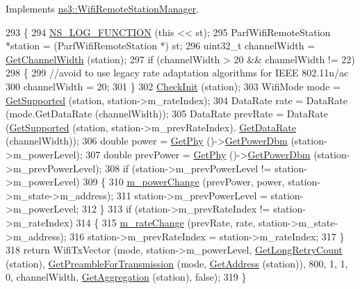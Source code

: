 Implements \hyperlink{classns3_1_1WifiRemoteStationManager_a5a6b2bfcd4959da43c54f0072bd01202}{ns3\+::\+Wifi\+Remote\+Station\+Manager}.


\begin{DoxyCode}
293 \{
294   \hyperlink{log-macros-disabled_8h_a90b90d5bad1f39cb1b64923ea94c0761}{NS\_LOG\_FUNCTION} (\textcolor{keyword}{this} << st);
295   ParfWifiRemoteStation *station = (ParfWifiRemoteStation *) st;
296   uint32\_t channelWidth = \hyperlink{classns3_1_1WifiRemoteStationManager_a918213c5b9fa629c4986f6d90521bbd4}{GetChannelWidth} (station);
297   \textcolor{keywordflow}{if} (channelWidth > 20 && channelWidth != 22)
298     \{
299       \textcolor{comment}{//avoid to use legacy rate adaptation algorithms for IEEE 802.11n/ac}
300       channelWidth = 20;
301     \}
302   \hyperlink{classns3_1_1ParfWifiManager_a2a7ea7d1accf1ce9056c91929db2e7eb}{CheckInit} (station);
303   WifiMode mode = \hyperlink{classns3_1_1WifiRemoteStationManager_a995c8bae0d84b168fd3e8bc9ecaacdd4}{GetSupported} (station, station->m\_rateIndex);
304   DataRate rate = DataRate (mode.GetDataRate (channelWidth));
305   DataRate prevRate = DataRate (\hyperlink{classns3_1_1WifiRemoteStationManager_a995c8bae0d84b168fd3e8bc9ecaacdd4}{GetSupported} (station, station->m\_prevRateIndex).
      \hyperlink{classns3_1_1WifiMode_adcfbe150f69da720db23387f733b8a52}{GetDataRate} (channelWidth));
306   \textcolor{keywordtype}{double} power = \hyperlink{classns3_1_1WifiRemoteStationManager_ab92b49cf78e0b72a51f5d13a1f15e242}{GetPhy} ()->\hyperlink{classns3_1_1WifiPhy_a91fbc9ea51bb2ac6114cad1f70e25af0}{GetPowerDbm} (station->m\_powerLevel);
307   \textcolor{keywordtype}{double} prevPower = \hyperlink{classns3_1_1WifiRemoteStationManager_ab92b49cf78e0b72a51f5d13a1f15e242}{GetPhy} ()->\hyperlink{classns3_1_1WifiPhy_a91fbc9ea51bb2ac6114cad1f70e25af0}{GetPowerDbm} (station->m\_prevPowerLevel);
308   \textcolor{keywordflow}{if} (station->m\_prevPowerLevel != station->m\_powerLevel)
309     \{
310       \hyperlink{classns3_1_1ParfWifiManager_a3551006adb796a78525bc93430950b21}{m\_powerChange} (prevPower, power, station->m\_state->m\_address);
311       station->m\_prevPowerLevel = station->m\_powerLevel;
312     \}
313   \textcolor{keywordflow}{if} (station->m\_prevRateIndex != station->m\_rateIndex)
314     \{
315       \hyperlink{classns3_1_1ParfWifiManager_a6523cc884410af743890db3d24970f70}{m\_rateChange} (prevRate, rate, station->m\_state->m\_address);
316       station->m\_prevRateIndex = station->m\_rateIndex;
317     \}
318   \textcolor{keywordflow}{return} WifiTxVector (mode, station->m\_powerLevel, \hyperlink{classns3_1_1WifiRemoteStationManager_aac10b1403fb0bd670f8a8bd6d7e48304}{GetLongRetryCount} (station), 
      \hyperlink{classns3_1_1WifiRemoteStationManager_a0f44967cbd7488baada4802ebc642110}{GetPreambleForTransmission} (mode, \hyperlink{classns3_1_1WifiRemoteStationManager_ac9ccc8c514bd8d2af05c290e63461a2a}{GetAddress} (station)), 800, 1, 1, 0, 
      channelWidth, \hyperlink{classns3_1_1WifiRemoteStationManager_a5421c8d510cb16eebeac9f2ea9dd73c3}{GetAggregation} (station), \textcolor{keyword}{false});
319 \}
\end{DoxyCode}


